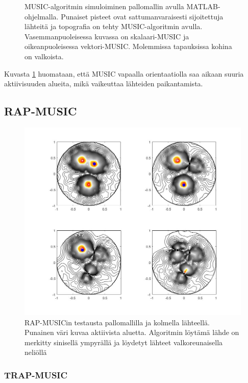 \begin{figure}[h]
\begin{minipage}{0.45\textwidth}
    \end{minipage}
    \caption{MUSIC-algoritmin simuloiminen pallomallin avulla MATLAB-ohjelmalla. Punaiset pisteet ovat sattumanvaraisesti sijoitettuja lähteitä ja topografia on tehty MUSIC-algoritmin avulla. Vasemmanpuoleisessa kuvassa on skalaari-MUSIC ja oikeanpuoleisessa vektori-MUSIC. Molemmissa tapauksissa kohina on valkoista.}
    \label{fig:MUSIC}
\end{figure}

Kuvasta \ref{fig:MUSIC} huomataan, että MUSIC vapaalla orientaatiolla saa aikaan suuria aktiivisuuden alueita, mikä vaikeuttaa lähteiden paikantamista.

\clearpage
\subsection{RAP-MUSIC}
\begin{figure}[h]
    \centering
    \includegraphics[width=1\textwidth]{rap11.jpg}
    \caption{RAP-MUSICin testausta pallomallilla ja kolmella lähteellä. Punainen väri kuvaa aktiivista aluetta. Algoritmin löytämä lähde on merkitty sinisellä ympyrällä ja löydetyt lähteet valkoreunaisella neliöllä}
    \label{fig:RAP}
\end{figure}

\subsubsection{TRAP-MUSIC}